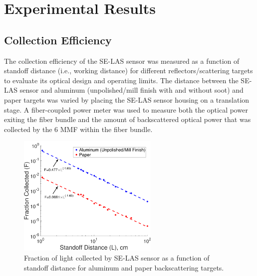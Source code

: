 \section{Experimental Results}
\subsection{Collection Efficiency}
The collection efficiency of the SE-LAS sensor was measured as a function of standoff distance (i.e., working distance) for different reflectors/scattering targets to evaluate its optical design and operating limits. The distance between the SE-LAS sensor and aluminum (unpolished/mill finish with and without soot) and paper targets was varied by placing the SE-LAS sensor housing on a translation stage. A fiber-coupled power meter was used to measure both the optical power exiting the fiber bundle and the amount of backscattered optical power that was collected by the 6 MMF within the fiber bundle. 

 \begin{figure}[b]
    \centering
        \includegraphics[width=0.6\textwidth]{fig/ch4_fig11_v2.png}
        \caption{Fraction of light collected by SE-LAS sensor as a function of standoff distance for aluminum and paper backscattering targets.}
    \label{fig:ch4_5}
\end{figure}

